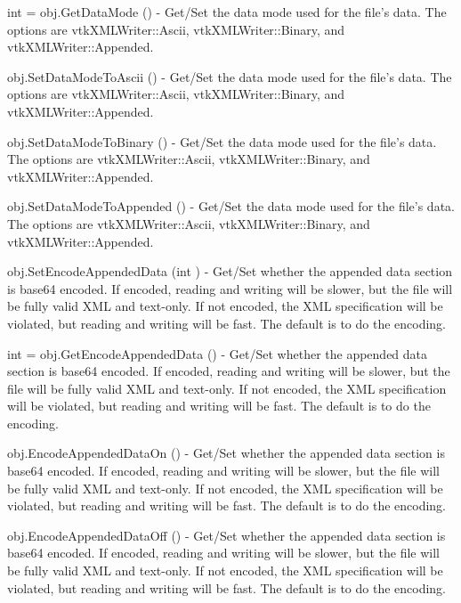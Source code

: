 \begin{DoxyItemize}
\item {\ttfamily int = obj.\-Get\-Data\-Mode ()} -\/ Get/\-Set the data mode used for the file's data. The options are vtk\-X\-M\-L\-Writer\-::\-Ascii, vtk\-X\-M\-L\-Writer\-::\-Binary, and vtk\-X\-M\-L\-Writer\-::\-Appended.  
\item {\ttfamily obj.\-Set\-Data\-Mode\-To\-Ascii ()} -\/ Get/\-Set the data mode used for the file's data. The options are vtk\-X\-M\-L\-Writer\-::\-Ascii, vtk\-X\-M\-L\-Writer\-::\-Binary, and vtk\-X\-M\-L\-Writer\-::\-Appended.  
\item {\ttfamily obj.\-Set\-Data\-Mode\-To\-Binary ()} -\/ Get/\-Set the data mode used for the file's data. The options are vtk\-X\-M\-L\-Writer\-::\-Ascii, vtk\-X\-M\-L\-Writer\-::\-Binary, and vtk\-X\-M\-L\-Writer\-::\-Appended.  
\item {\ttfamily obj.\-Set\-Data\-Mode\-To\-Appended ()} -\/ Get/\-Set the data mode used for the file's data. The options are vtk\-X\-M\-L\-Writer\-::\-Ascii, vtk\-X\-M\-L\-Writer\-::\-Binary, and vtk\-X\-M\-L\-Writer\-::\-Appended.  
\item {\ttfamily obj.\-Set\-Encode\-Appended\-Data (int )} -\/ Get/\-Set whether the appended data section is base64 encoded. If encoded, reading and writing will be slower, but the file will be fully valid X\-M\-L and text-\/only. If not encoded, the X\-M\-L specification will be violated, but reading and writing will be fast. The default is to do the encoding.  
\item {\ttfamily int = obj.\-Get\-Encode\-Appended\-Data ()} -\/ Get/\-Set whether the appended data section is base64 encoded. If encoded, reading and writing will be slower, but the file will be fully valid X\-M\-L and text-\/only. If not encoded, the X\-M\-L specification will be violated, but reading and writing will be fast. The default is to do the encoding.  
\item {\ttfamily obj.\-Encode\-Appended\-Data\-On ()} -\/ Get/\-Set whether the appended data section is base64 encoded. If encoded, reading and writing will be slower, but the file will be fully valid X\-M\-L and text-\/only. If not encoded, the X\-M\-L specification will be violated, but reading and writing will be fast. The default is to do the encoding.  
\item {\ttfamily obj.\-Encode\-Appended\-Data\-Off ()} -\/ Get/\-Set whether the appended data section is base64 encoded. If encoded, reading and writing will be slower, but the file will be fully valid X\-M\-L and text-\/only. If not encoded, the X\-M\-L specification will be violated, but reading and writing will be fast. The default is to do the encoding.  

\end{DoxyItemize}

